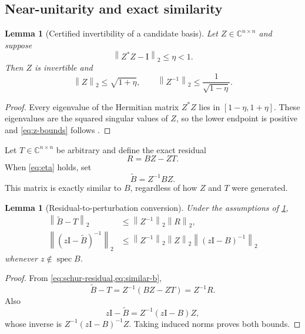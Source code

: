 \documentclass[11pt]{article}
\newtheorem{lemma}[theorem]{Lemma}
\theoremstyle{definition}
\theoremstyle{remark}
\newcommand{\C}{\mathbb C}
\newcommand{\Id}{\mathrm I}
\newcommand{\norm}[1]{\left\lVert#1\right\rVert}
\newcommand{\spec}{\operatorname{spec}}
\begin{document}
\subsection{Near-unitarity and exact similarity}

\begin{lemma}[Certified invertibility of a candidate basis]
\label{lem:near-unitary}
Let \(Z\in\C^{n\times n}\) and suppose
\begin{equation}
 \norm{Z^*Z-\Id}_2\leq\eta<1.
 \label{eq:eta}
\end{equation}
Then \(Z\) is invertible and
\begin{equation}
 \norm{Z}_2\leq\sqrt{1+\eta},
 \qquad
 \norm{Z^{-1}}_2\leq\frac{1}{\sqrt{1-\eta}}.
 \label{eq:z-bounds}
\end{equation}
\end{lemma}

\begin{proof}
Every eigenvalue of the Hermitian matrix \(Z^*Z\) lies in
\([1-\eta,1+\eta]\).  These eigenvalues are the squared singular values of
\(Z\), so the lower endpoint is positive and \cref{eq:z-bounds} follows
\citep{HornJohnson2013}.
\end{proof}

Let \(T\in\C^{n\times n}\) be arbitrary and define the exact residual
\begin{equation}
 R=BZ-ZT.
 \label{eq:schur-residual}
\end{equation}
When \cref{eq:eta} holds, set
\begin{equation}
 \widetilde B=Z^{-1}BZ.
 \label{eq:similar-b}
\end{equation}
This matrix is exactly similar to \(B\), regardless of how \(Z\) and \(T\)
were generated.

\begin{lemma}[Residual-to-perturbation conversion]
\label{lem:residual-conversion}
Under the assumptions of \cref{lem:near-unitary},
\begin{align}
 \norm{\widetilde B-T}_2
 &\leq \norm{Z^{-1}}_2\norm{R}_2,
 \label{eq:transformed-residual}\\
 \norm{(z\Id-\widetilde B)^{-1}}_2
 &\leq
 \norm{Z^{-1}}_2\norm{Z}_2
 \norm{(z\Id-B)^{-1}}_2
 \label{eq:transformed-resolvent}
\end{align}
whenever \(z\notin\spec B\).
\end{lemma}

\begin{proof}
From \cref{eq:schur-residual,eq:similar-b},
\[
 \widetilde B-T=Z^{-1}(BZ-ZT)=Z^{-1}R.
\]
Also
\[
 z\Id-\widetilde B=Z^{-1}(z\Id-B)Z,
\]
whose inverse is
\(Z^{-1}(z\Id-B)^{-1}Z\).  Taking induced norms proves both bounds.
\end{proof}
\end{document}
